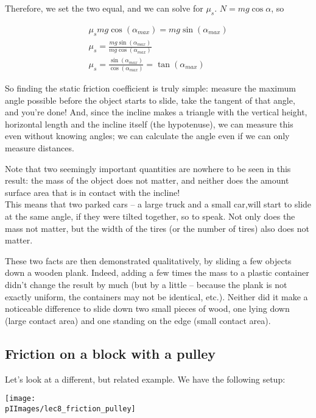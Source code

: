 Therefore, we set the two equal, and we can solve for $\mu_s$. $N = m g \cos \alpha$, so

\begin{align}
\mu_s m g \cos (\alpha_{max}) = m g \sin(\alpha_{max})\\
\mu_s = \frac{m g \sin(\alpha_{max})}{m g \cos (\alpha_{max})}\\
\mu_s = \frac{\sin(\alpha_{max})}{\cos (\alpha_{max})} = \tan(\alpha_{max})
\end{align}

So finding the static friction coefficient is truly simple: measure the maximum angle possible before the object starts to slide, take the tangent of that angle, and you're done! And, since the incline makes a triangle with the vertical height, horizontal length and the incline itself (the hypotenuse), we can measure this even without knowing angles; we can calculate the angle even if we can only measure distances.

Note that two seemingly important quantities are nowhere to be seen in this result: the mass of the object does not matter, and neither does the amount surface area that is in contact with the incline!\\
This means that two parked cars -- a large truck and a small car,will start to slide at the same angle, if they were tilted together, so to speak. Not only does the mass not matter, but the width of the tires (or the number of tires) also does not matter.

These two facts are then demonstrated qualitatively, by sliding a few objects down a wooden plank. Indeed, adding a few times the mass to a plastic container didn't change the result by much (but by a little -- because the plank is not exactly uniform, the containers may not be identical, etc.). Neither did it make a noticeable difference to slide down two small pieces of wood, one lying down (large contact area) and one standing on the edge (small contact area).

\subsection{Friction on a block with a pulley}

Let's look at a different, but related example. We have the following setup:

\begin{center}
\texttt{[image: \\pIImages/lec8\_friction\_pulley]}
\end{center}

